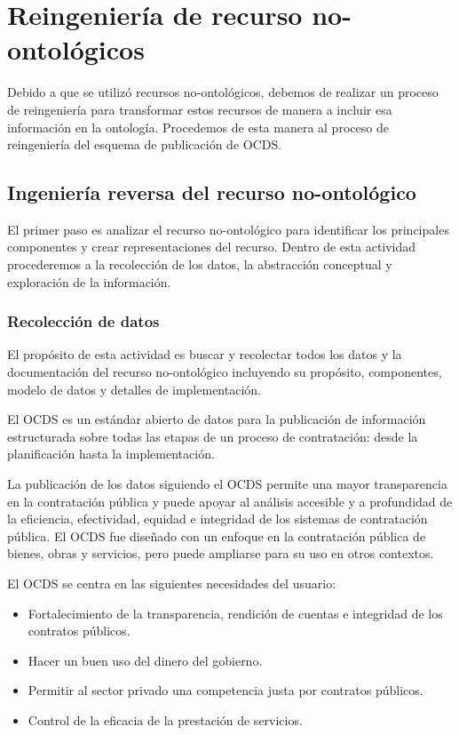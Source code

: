 \section{Reingeniería de recurso no-ontológicos}
Debido a que se utilizó recursos no-ontológicos, debemos de realizar un proceso de reingeniería para transformar estos recursos de manera a incluir esa información en la ontología. Procedemos de esta manera al proceso de reingeniería del esquema de publicación de OCDS.


\subsection{Ingeniería reversa del recurso no-ontológico}
El primer paso es analizar el recurso no-ontológico para identificar los principales componentes y crear representaciones del recurso. Dentro de esta actividad procederemos a la recolección de los datos, la abstracción conceptual y exploración de la información.

\subsubsection{Recolección de datos}

El propósito de esta actividad es buscar y recolectar todos los datos y la documentación del recurso no-ontológico incluyendo su propósito, componentes, modelo de datos y detalles de implementación.

El OCDS es un estándar abierto de datos para la publicación de información estructurada sobre todas las etapas de un proceso de contratación: desde la planificación hasta la implementación.

La publicación de los datos siguiendo el OCDS permite una mayor transparencia en la contratación pública y puede apoyar al análisis accesible y a profundidad de la eficiencia, efectividad, equidad e integridad de los sistemas de contratación pública. El OCDS fue diseñado con un enfoque en la contratación pública de bienes, obras y servicios, pero puede ampliarse para su uso en otros contextos. 

El OCDS se centra en las siguientes necesidades del usuario:
\begin{itemize}
    \item Fortalecimiento de la transparencia, rendición de cuentas e integridad de los contratos públicos.
    \item Hacer un buen uso del dinero del gobierno.
    \item Permitir al sector privado una competencia justa por contratos públicos.
    \item Control de la eficacia de la prestación de servicios. 
\end{itemize}

